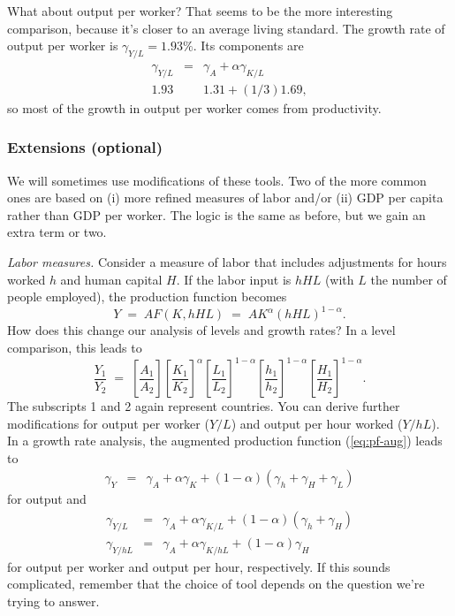 \documentclass[letterpaper,12pt]{article}
\begin{document}
What about output per worker?
That seems to be the more interesting comparison, 
because it's closer to an average living standard.  
The growth rate of output per worker is 
$ \gamma_{Y/L} = 1.93\% $.
Its components are 
\begin{eqnarray*}
    \gamma_{Y/L} &=& \gamma_A + \alpha \gamma_{K/L} \\
      1.93   && 1.31 + (1/3) 1.69 ,
\end{eqnarray*}
so most of the growth in output per worker comes from 
productivity.  


\subsubsection*{Extensions (optional)}

We will sometimes use modifications of these tools.
Two of the more common ones are based on
(i) more refined measures of labor
and/or (ii) GDP per capita rather than GDP per worker.
The logic is the same as before, but we gain an extra term or two.


{\it Labor measures.}
Consider a measure of labor that includes
adjustments for hours worked $h$ and human capital $H$.
If the labor input is $hHL$ (with $L$ the number of people employed),
the production function becomes
\begin{equation}
    Y \;=\; A F(K,hHL) \;=\; A K^\alpha (hHL)^{1-\alpha} .
    \label{eq:pf-aug}
\end{equation}
How does this change our analysis of levels and growth rates?
In a  level comparison, this leads to
\[
    \frac{Y_1}{Y_2} \;=\;
             \left[ \frac{A_1}{A_2} \right]
             \left[ \frac{K_1}{K_2} \right]^\alpha
             \left[ \frac{L_1}{L_2} \right]^{1-\alpha}
             \left[ \frac{h_1}{h_2} \right]^{1-\alpha}
             \left[ \frac{H_1}{H_2} \right]^{1-\alpha} .
\]
The subscripts 1 and 2 again represent countries.
You can derive further modifications for output per worker ($Y/L$)
and output per hour worked ($Y/hL$).
In a growth rate analysis,
the augmented production function (\ref{eq:pf-aug})
leads to
\begin{eqnarray*}
    \gamma_Y &=& \gamma_A + \alpha \gamma_K + (1-\alpha)
        (\gamma_h + \gamma_H + \gamma_L)
\end{eqnarray*}
for output and
\begin{eqnarray*}
    \gamma_{Y/L} &=&  \gamma_A
                + \alpha \gamma_{K/L}
                    + (1-\alpha) (\gamma_h + \gamma_H ) \\
    \gamma_{Y/hL} &=&  \gamma_A
                + \alpha \gamma_{K/hL}
                    + (1-\alpha) \gamma_H
\end{eqnarray*}
for output per worker and output per hour, respectively.
If this sounds complicated, remember that the choice of tool
depends on the question we're trying to answer.
\end{document}
